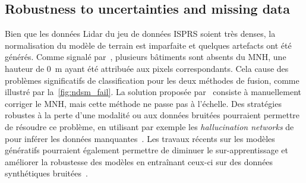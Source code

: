 \subsection{Robustness to uncertainties and missing data}

Bien que les données \gls{Lidar} du jeu de données ISPRS soient très denses, la normalisation du modèle de terrain est imparfaite et quelques artefacts ont été générés. Comme signalé par~\citet{marmanis_classification_2017}, plusieurs bâtiments sont absents du \gls{MNH}, une hauteur de \SI{0}{\meter} ayant été attribuée aux pixels correspondants. Cela cause des problèmes significatifs de classification pour les deux méthodes de fusion, comme illustré par la~\cref{fig:ndsm_fail}. La solution proposée par~\cite{marmanis_classification_2017} consiste à manuellement corriger le \gls{MNH}, mais cette méthode ne passe pas à l'échelle. Des stratégies robustes à la perte d'une modalité ou aux données bruitées pourraient permettre de résoudre ce problème, en utilisant par exemple les \emph{hallucination networks} de~\citet{hoffman_learning_2016} pour inférer les données manquantes~\cite{kampffmeyer_semantic_2016}. Les travaux récents sur les modèles génératifs pourraient également permettre de diminuer le sur-apprentissage et améliorer la robustesse des modèles en entraînant ceux-ci sur des données synthétiques bruitées~\cite{Xie_2017_ICCV}.









